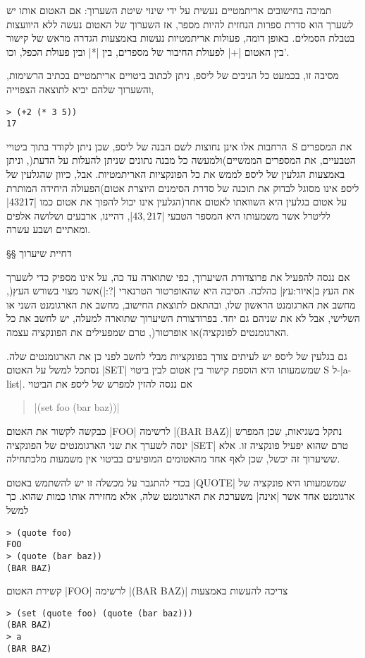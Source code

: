 תמיכה בחישובים אריתמטיים נעשית על ידי שינוי שיטת השערוך: אם האטום אותו יש לשערך
הוא סדרת ספרות הנחזית להיות מספר, אז השערוך של האטום נעשה ללא היוועצות בטבלת
הסמלים. באופן דומה, פעולות אריתמטיות נעשות באמצעות הגדרה מראש של קישור בין
האטום \T|+| לפעולת החיבור של מספרים, בין \T|*| ובין פעולת הכפל, וכו'.

מסיבה זו, בכמעט כל הניבים של ליספ, ניתן לכתוב ביטויים אריתמטיים בכתיב
הרשימות, והשערוך שלהם יביא לתוצאה הצפוייה,

\begin{english}
\begin{verbatim}
> (+2 (* 3 5))
17
\end{verbatim}
\end{english}

הרחבות אלו אינן נחוצות לשם הבנה של ליספ, שכן ניתן לקודד בתוך ביטויי~S את
המספרים הטבעיים, את המספרים הממשיים)ולמעשה כל מבנה נתונים שניתן להעלות על
הדעת(, וניתן באמצעות הגלעין של ליספ לממש את כל הפונקציות האריתמטיות. אבל, כיוון
שהגלעין של ליספ אינו מסוגל לבדוק את תוכנה של סדרת הסימנים היוצרת אטום)הפעולה
היחידה המותרת על אטום בגלעין היא השוואתו לאטום אחר(הגלעין אינו יכול להפוך את
אטום כמו \T|43217| לליטרל אשר משמעותו היא המספר הטבעי \E|$43,217$|,
דהיינו, ארבעים ושלושה אלפים ומאתיים ושבע עשרה.

§§ דחיית שיערוך

אם ננסה להפעיל את פרוצדורת השיערוך, כפי שתוארה עד כה, על אינו מספיק כדי לשערך
את העץ ב|איור:עץ| כהלכה. הסיבה היא שהאופרטור הטרנארי \T|?:|)אשר מצוי בשורש
העץ(, מחשב את הארגומנט הראשון שלו, ובהתאם לתוצאת החישוב, מחשב את הארגומנט השני
או השלישי, אבל לא את שניהם גם יחד. בפרודצורת השיערוך שתוארה למעלה, יש לחשב את
כל הארגומנטים לפונקציה)או אופרטור(, טרם שמפעילים את הפונקציה עצמה.

גם בגלעין של ליספ יש לעיתים צורך בפונקציות מבלי לחשב לפני כן את הארגומנטים שלה.
נסתכל למשל על האטום \T|SET| שמשמעותו היא הוספת קישור בין אטום לבין ביטוי S
ל-\E|a-list|.
אם ננסה להזין למפרש של ליספ את הביטוי
\begin{quote}
  \T|(set foo (bar baz))|
\end{quote}
כבקשה לקשור את האטום \T|FOO| לרשימה
\T|(BAR BAZ)|
נתקל בשגיאות, שכן המפרש ינסה לשערך את שני הארגומנטים של הפונקציה \T|SET| טרם
שהוא יפעיל פונקציה זו. אלא ששיערוך זה יכשל, שכן לאף אחד מהאטומים המופיעים
בביטוי אין משמעות מלכתחילה.

בכדי להתגבר על מכשלה זו יש להשתמש באטום \T|QUOTE|
שמשמעותו היא פונקציה של ארגומנט אחד אשר \ע|אינה| משערכת את
הארגומנט שלה, אלא מחזירה אותו כמות שהוא.
כך למשל
\begin{LTR}
\begin{verbatim}
> (quote foo)
FOO
> (quote (bar baz))
(BAR BAZ)
\end{verbatim}
\end{LTR}
קשירת האטום \T|FOO| לרשימה
\T|(BAR BAZ)| צריכה להעשות באמצעות
\begin{LTR}
\begin{verbatim}
> (set (quote foo) (quote (bar baz)))
(BAR BAZ)
> a
(BAR BAZ)
\end{verbatim}
\end{LTR}

